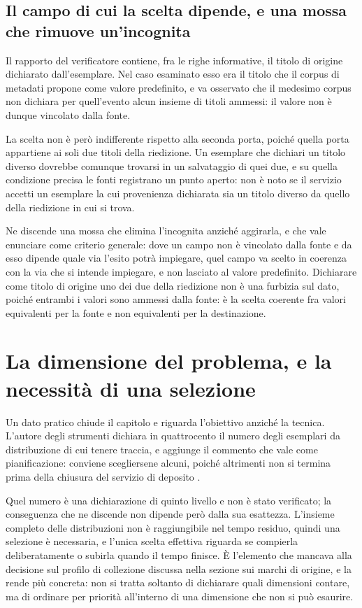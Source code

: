 \subsection*{Il campo di cui la scelta dipende, e una mossa che rimuove un'incognita}

Il rapporto del verificatore contiene, fra le righe informative, il titolo di origine dichiarato dall'esemplare. Nel caso esaminato esso era il titolo che il corpus di metadati propone come valore predefinito, e va osservato che il medesimo corpus non dichiara per quell'evento alcun insieme di titoli ammessi: il valore non è dunque vincolato dalla fonte.

La scelta non è però indifferente rispetto alla seconda porta, poiché quella porta appartiene ai soli due titoli della riedizione. Un esemplare che dichiari un titolo diverso dovrebbe comunque trovarsi in un salvataggio di quei due, e su quella condizione precisa le fonti registrano un punto aperto: non è noto se il servizio accetti un esemplare la cui provenienza dichiarata sia un titolo diverso da quello della riedizione in cui si trova.

Ne discende una mossa che elimina l'incognita anziché aggirarla, e che vale enunciare come criterio generale: dove un campo non è vincolato dalla fonte e da esso dipende quale via l'esito potrà impiegare, quel campo va scelto in coerenza con la via che si intende impiegare, e non lasciato al valore predefinito. Dichiarare come titolo di origine uno dei due della riedizione non è una furbizia sul dato, poiché entrambi i valori sono ammessi dalla fonte: è la scelta coerente fra valori equivalenti per la fonte e non equivalenti per la destinazione.

\section{La dimensione del problema, e la necessità di una selezione}

Un dato pratico chiude il capitolo e riguarda l'obiettivo anziché la tecnica. L'autore degli strumenti dichiara in quattrocento il numero degli esemplari da distribuzione di cui tenere traccia, e aggiunge il commento che vale come pianificazione: conviene scegliersene alcuni, poiché altrimenti non si termina prima della chiusura del servizio di deposito \cite{mankeymite-server}.

Quel numero è una dichiarazione di quinto livello e non è stato verificato; la conseguenza che ne discende non dipende però dalla sua esattezza. L'insieme completo delle distribuzioni non è raggiungibile nel tempo residuo, quindi una selezione è necessaria, e l'unica scelta effettiva riguarda se compierla deliberatamente o subirla quando il tempo finisce. È l'elemento che mancava alla decisione sul profilo di collezione discussa nella sezione sui marchi di origine, e la rende più concreta: non si tratta soltanto di dichiarare quali dimensioni contare, ma di ordinare per priorità all'interno di una dimensione che non si può esaurire.

